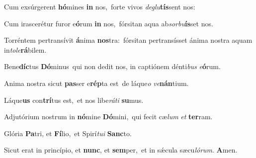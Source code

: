 Cum exsúrgerent \textbf{hó}mines \textbf{in} nos,~\redgreheightstar forte vivos \textit{de}\textit{glu}\textbf{tís}sent nos:

Cum irascerétur furor e\textbf{ó}rum \textbf{in} nos,~\redgreheightstar fórsitan aqua ab\textit{sor}\textit{bu}\textbf{ís}set nos.

Torréntem pertransívit \textbf{á}nima \textbf{nos}tra:~\redgreheightstar fórsitan pertransísset ánima nostra aquam in\textit{to}\textit{le}\textbf{rá}bilem.

Bene\textbf{díc}tus \textbf{Dó}minus~\redgreheightstar qui non dedit nos, in captiónem dénti\textit{bus} \textit{e}\textbf{ó}rum.

Anima nostra sicut \textbf{pas}ser e\textbf{rép}ta est~\redgreheightstar de láque\textit{o} \textit{ve}\textbf{nán}tium.

Láque\textbf{us} con\textbf{trí}tus est,~\redgreheightstar et nos libe\textit{rá}\textit{ti} \textbf{su}mus.

Adjutórium nostrum in \textbf{nó}mine \textbf{Dó}mini,~\redgreheightstar qui fecit cæ\textit{lum} \textit{et} \textbf{ter}ram.

Glória \textbf{Pa}tri, et \textbf{Fí}lio,~\redgreheightstar et Spirí\textit{tu}\textit{i} \textbf{Sanc}to.

Sicut erat in princípio, et \textbf{nunc}, et \textbf{sem}per,~\redgreheightstar et in sǽcula sæcu\textit{ló}\textit{rum}. \textbf{A}men.

